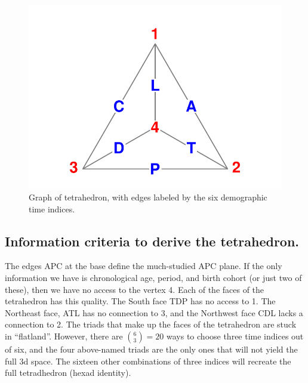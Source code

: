 \documentclass[11pt,oneside,a4paper]{article} %
\begin{document}
\begin{figure}[h!]
\centering
\caption{Graph of tetrahedron, with edges labeled by the six demographic time
indices.}
\label{fig:tet}
\includegraphics[scale=1]{Figures/TetraHedronVerticesEdges.pdf}
\end{figure}

\subsection*{Information criteria to derive the tetrahedron.}
The edges APC at the base define the much-studied APC plane. If the only
information we have is chronological age, period, and birth cohort (or just two
of these), then we have no access to the vertex 4. Each of the faces of the
tetrahedron has this quality. The South face TDP has no access to 1.
The Northeast face, ATL has no connection to 3, and the Northwest face
CDL lacks a connection to 2. The triads that make up the faces of
the tetrahedron are stuck in ``flatland''. However, there are $\binom{6}{3}=20$ ways to choose three time indices out of six, and the four
above-named triads are the only ones that will not yield the full 3d
space. The sixteen other combinations of three indices will recreate the full tetradhedron (hexad identity).



\end{document}
